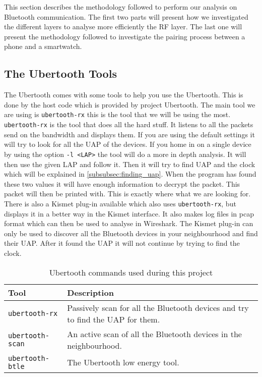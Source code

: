This section describes the methodology followed to perform our analysis on Bluetooth communication. The first two parts will present how we investigated the different layers to analyse more efficiently the RF layer. The last one will present the methodology followed to investigate the pairing process between a phone and a smartwatch.


\subsection{The Ubertooth Tools}
\label{subsubsec:ubertooth_tools}
The Ubertooth comes with some tools to help you use the Ubertooth. This is done by the host code which is provided by project Ubertooth. 
The main tool we are using is \verb|ubertooth-rx|  this is the tool that we will be using the most. \verb|ubertooth-rx| is the tool that does all the hard stuff. It listens to all the packets send on the bandwidth and displays them. If you are using the default settings it will try to look for all the UAP of the devices. If you home in on a single device by using the option \verb|-l <LAP>| the tool will do a more in depth analysis. It will then use the given LAP and follow it. Then it will try to find UAP and the clock which will be explained in \ref{subsubsec:finding_uap}. When the program has found these two values it will have enough information to decrypt the packet. This packet will then be printed with. This is exactly where what we are looking for. \pend There is also a Kismet plug-in available which also uses \verb|ubertooth-rx|, but displays it in a better way in the Kismet interface. It also makes log files in pcap format which can then be used to analyse in Wireshark. The Kismet plug-in can only be used to discover all the Bluetooth devices in your neighbourhood and find their UAP. After it found the UAP it will not continue by trying to find the clock.

\begin{table}[!h]
\begin{tabular}{|l|l|}
\hline
Tool & Description \\
\hline
\verb|ubertooth-rx| & Passively scan for all the Bluetooth devices and try to find the UAP for them. \\
\hline
\verb|ubertooth-scan| & An active scan of all the Bluetooth devices in the neighbourhood.  \\
\hline
\verb|ubertooth-btle| & The Ubertooth low energy tool. \\
\hline
\end{tabular}
\caption{Ubertooth commands used during this project}
\label{tab:ubertooth_tools}
\end{table}
